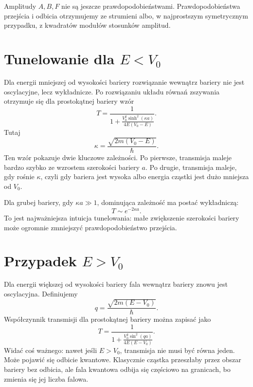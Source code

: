 \begin{summarybox}
Amplitudy \(A,B,F\) nie są jeszcze prawdopodobieństwami. Prawdopodobieństwa przejścia i odbicia otrzymujemy ze strumieni albo, w najprostszym symetrycznym przypadku, z kwadratów modułów stosunków amplitud.
\end{summarybox}

\section{Tunelowanie dla \texorpdfstring{\(E<V_0\)}{E<V0}}

Dla energii mniejszej od wysokości bariery rozwiązanie wewnątrz bariery nie jest oscylacyjne, lecz wykładnicze. Po rozwiązaniu układu równań zszywania otrzymuje się dla prostokątnej bariery wzór
\begin{equation}
    T=\frac{1}{1+\frac{V_0^2\sinh^2(\kappa a)}{4E(V_0-E)}}.
\end{equation}
Tutaj
\begin{equation}
    \kappa=\frac{\sqrt{2m(V_0-E)}}{\hbar}.
\end{equation}
Ten wzór pokazuje dwie kluczowe zależności. Po pierwsze, transmisja maleje bardzo szybko ze wzrostem szerokości bariery \(a\). Po drugie, transmisja maleje, gdy rośnie \(\kappa\), czyli gdy bariera jest wysoka albo energia cząstki jest dużo mniejsza od \(V_0\).

Dla grubej bariery, gdy \(\kappa a\gg 1\), dominująca zależność ma postać wykładniczą:
\begin{equation}
    T\sim e^{-2\kappa a}.
\end{equation}
To jest najważniejsza intuicja tunelowania: małe zwiększenie szerokości bariery może ogromnie zmniejszyć prawdopodobieństwo przejścia.

\section{Przypadek \texorpdfstring{\(E>V_0\)}{E>V0}}

Dla energii większej od wysokości bariery fala wewnątrz bariery znowu jest oscylacyjna. Definiujemy
\begin{equation}
    q=\frac{\sqrt{2m(E-V_0)}}{\hbar}.
\end{equation}
Współczynnik transmisji dla prostokątnej bariery można zapisać jako
\begin{equation}
    T=\frac{1}{1+\frac{V_0^2\sin^2(qa)}{4E(E-V_0)}}.
\end{equation}
Widać coś ważnego: nawet jeśli \(E>V_0\), transmisja nie musi być równa jeden. Może pojawić się odbicie kwantowe. Klasycznie cząstka przeszłaby przez obszar bariery bez odbicia, ale fala kwantowa odbija się częściowo na granicach, bo zmienia się jej liczba falowa.


